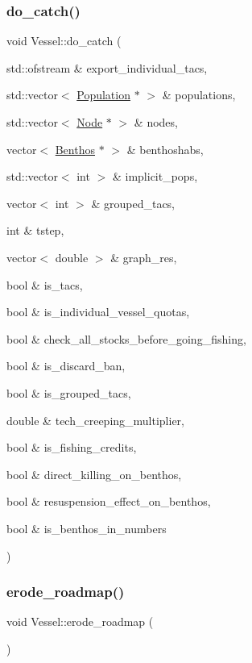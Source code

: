 \subsubsection{\texorpdfstring{do\_catch()}{do\_catch()}}
{\footnotesize\ttfamily void Vessel\+::do\+\_\+catch (\begin{DoxyParamCaption}\item[{std\+::ofstream \&}]{export\+\_\+individual\+\_\+tacs,  }\item[{std\+::vector$<$ \mbox{\hyperlink{class_population}{Population}} $\ast$ $>$ \&}]{populations,  }\item[{std\+::vector$<$ \mbox{\hyperlink{class_node}{Node}} $\ast$ $>$ \&}]{nodes,  }\item[{vector$<$ \mbox{\hyperlink{class_benthos}{Benthos}} $\ast$ $>$ \&}]{benthoshabs,  }\item[{std\+::vector$<$ int $>$ \&}]{implicit\+\_\+pops,  }\item[{vector$<$ int $>$ \&}]{grouped\+\_\+tacs,  }\item[{int \&}]{tstep,  }\item[{vector$<$ double $>$ \&}]{graph\+\_\+res,  }\item[{bool \&}]{is\+\_\+tacs,  }\item[{bool \&}]{is\+\_\+individual\+\_\+vessel\+\_\+quotas,  }\item[{bool \&}]{check\+\_\+all\+\_\+stocks\+\_\+before\+\_\+going\+\_\+fishing,  }\item[{bool \&}]{is\+\_\+discard\+\_\+ban,  }\item[{bool \&}]{is\+\_\+grouped\+\_\+tacs,  }\item[{double \&}]{tech\+\_\+creeping\+\_\+multiplier,  }\item[{bool \&}]{is\+\_\+fishing\+\_\+credits,  }\item[{bool \&}]{direct\+\_\+killing\+\_\+on\+\_\+benthos,  }\item[{bool \&}]{resuspension\+\_\+effect\+\_\+on\+\_\+benthos,  }\item[{bool \&}]{is\+\_\+benthos\+\_\+in\+\_\+numbers }\end{DoxyParamCaption})}

\mbox{\label{class_vessel_a256ecb4ddbbd21e1569669d15b7d0dc0}} 
\subsubsection{\texorpdfstring{erode\_roadmap()}{erode\_roadmap()}}
{\footnotesize\ttfamily void Vessel\+::erode\+\_\+roadmap (\begin{DoxyParamCaption}{ }\end{DoxyParamCaption})}

